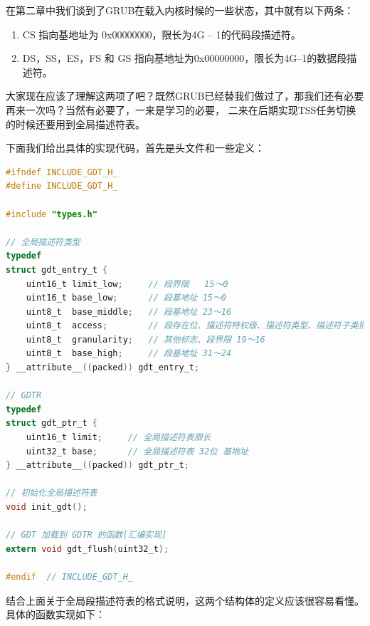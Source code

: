 \par 在第二章中我们谈到了GRUB在载入内核时候的一些状态，其中就有以下两条：

\begin{mdframed}
	\begin{enumerate}
		\item CS 指向基地址为 0x00000000，限长为4G – 1的代码段描述符。
		\item DS，SS，ES，FS 和 GS 指向基地址为0x00000000，限长为4G–1的数据段描述符。
	\end{enumerate}
\end{mdframed}

\par 大家现在应该了理解这两项了吧？既然GRUB已经替我们做过了，那我们还有必要再来一次吗？当然有必要了，一来是学习的必要，\allowbreak
二来在后期实现TSS任务切换的时候还要用到全局描述符表。

\par 下面我们给出具体的实现代码，首先是头文件和一些定义：

\begin{lstlisting}[language = C, caption = include/gdt.h]
#ifndef INCLUDE_GDT_H_
#define INCLUDE_GDT_H_

#include "types.h"

// 全局描述符类型
typedef
struct gdt_entry_t {
	uint16_t limit_low;     // 段界限   15～0
	uint16_t base_low;      // 段基地址 15～0
	uint8_t  base_middle;   // 段基地址 23～16
	uint8_t  access;        // 段存在位、描述符特权级、描述符类型、描述符子类别
	uint8_t  granularity; 	// 其他标志、段界限 19～16
	uint8_t  base_high;     // 段基地址 31～24
} __attribute__((packed)) gdt_entry_t;

// GDTR
typedef
struct gdt_ptr_t {
	uint16_t limit; 	// 全局描述符表限长
	uint32_t base; 		// 全局描述符表 32位 基地址
} __attribute__((packed)) gdt_ptr_t;

// 初始化全局描述符表
void init_gdt();

// GDT 加载到 GDTR 的函数[汇编实现]
extern void gdt_flush(uint32_t);

#endif 	// INCLUDE_GDT_H_
\end{lstlisting}

\par 结合上面关于全局段描述符表的格式说明，这两个结构体的定义应该很容易看懂。具体的函数实现如下：

